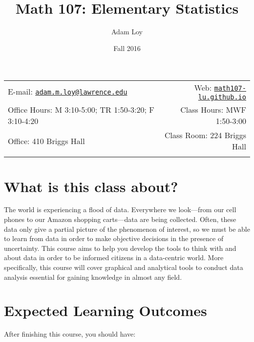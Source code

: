 \documentclass[11pt,]{article}
\title{Math 107: Elementary Statistics}
\author{Adam Loy}
\date{Fall 2016}
\begin{document}
  

		\maketitle
		
	
		\thispagestyle{firststyle}



	\noindent \begin{tabular*}{\textwidth}{ @{\extracolsep{\fill}} lr @{\extracolsep{\fill}}}


E-mail: \texttt{\href{mailto:adam.m.loy@lawrence.edu}{\nolinkurl{adam.m.loy@lawrence.edu}}} & Web: \href{http://math107-lu.github.io}{\tt math107-lu.github.io}\\
Office Hours: M 3:10-5:00; TR 1:50-3:20; F 3:10-4:20  &  Class Hours: MWF 1:50-3:00\\
Office: 410 Briggs Hall  & Class Room: 224 Briggs Hall\\
	&  \\
	\hline
	\end{tabular*}
	
\vspace{2mm}
	


\section{What is this class about?}\label{what-is-this-class-about}

The world is experiencing a flood of data. Everywhere we look---from our
cell phones to our Amazon shopping carts---data are being collected.
Often, these data only give a partial picture of the phenomenon of
interest, so we must be able to learn from data in order to make
objective decisions in the presence of uncertainty. This course aims to
help you develop the tools to think with and about data in order to be
informed citizens in a data-centric world. More specifically, this
course will cover graphical and analytical tools to conduct data
analysis essential for gaining knowledge in almost any field.

\section{Expected Learning Outcomes}\label{expected-learning-outcomes}

After finishing this course, you should have:
\end{document}

